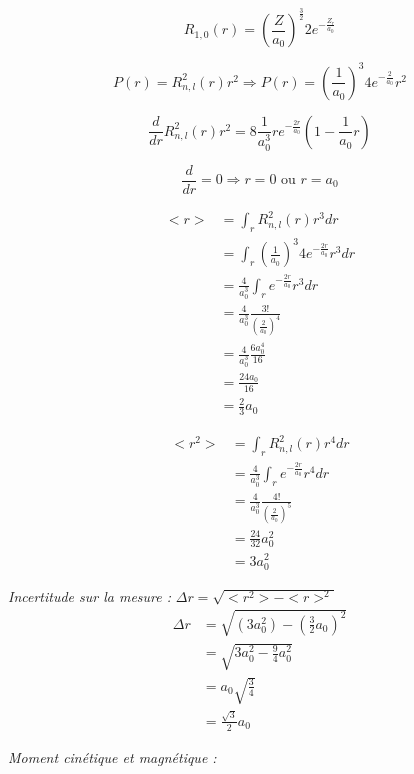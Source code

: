 \documentclass[../main.tex]{subfile}
\begin{document}
 \begin{ex}
    $$R_{1,0}(r) = (\frac{Z}{a_0})^{\frac{3}{2}} 2e^{-\frac{Z_r}{a_0}}$$

    $$P(r) = R_{n,l}^2(r)r^2 \Rightarrow P(r) = (\frac{1}{a_0})^{3} 4 e^{-\frac{2}{a_0}} r^2$$
      
    $$\frac{d}{dr} R_{n,l}^2(r) r^2 = 8\frac{1}{a_0^3} r e ^{-\frac{2r}{a_0}} (1-\frac{1}{a_0}r)$$

    $$\frac{d}{dr} = 0 \Rightarrow r=0 \text{ ou } r=a_0$$

    $$
    \begin{aligned}
         <r> &= \int_r R_{n,l}^2(r)r^3 dr\\
         &= \int_r (\frac{1}{a_0})^3 4 e^{-\frac{2r}{a_0}}r^3dr\\
         &= \frac{4}{a_0^3} \int_r e^{-\frac{2r}{a_0}} r^3 dr \\
         &= \frac{4}{a_0^3} \frac{3!}{(\frac{2}{a_0})^4}\\
         &= \frac{4}{a_0^3} \frac{6 a_0^4}{16}\\
         &= \frac{24 a_0}{16}\\
         &= \frac{2}{3} a_0
    \end{aligned}
    $$

    $$
    \begin{aligned}
         <r^2> &= \int_r R_{n,l}^2(r) r^4 dr \\
         &= \frac{4}{a_0^3} \int_r e^{-\frac{2r}{a_0}} r^4 dr \\
         &= \frac{4}{a_0^3} \frac{4!}{(\frac{2}{a_0})^5} \\
         &= \frac{24}{32}a_0^2\\
         &= 3a_0^2
    \end{aligned}
    $$

    \emph{Incertitude sur la mesure :} $\Delta r = \sqrt{<r^2> - <r>^2}$\\
    $$
    \begin{aligned}
         \Delta r &= \sqrt{(3a_0^2) - (\frac{3}{2}a_0)^2}\\
         &= \sqrt{3a_0^2 - \frac{9}{4}a_0^2}\\
         &= a_0 \sqrt{\frac{3}{4}} \\
         &= \frac{\sqrt{3}}{2} a_0
    \end{aligned}
    $$
 \end{ex}

 \emph{Moment cinétique et magnétique :}\\
\end{document}

